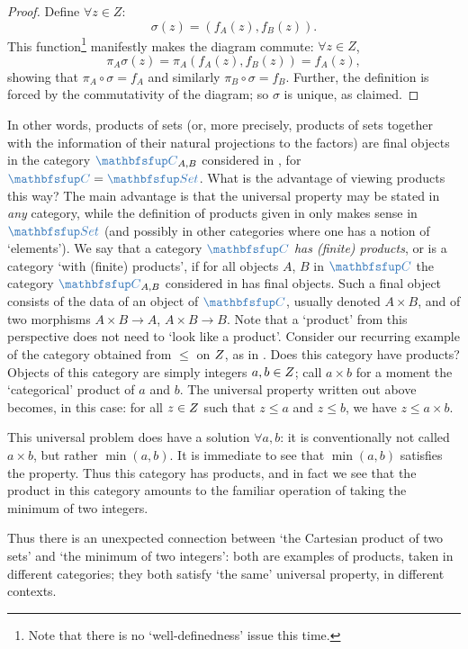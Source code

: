 \begin{proof}
  Define $\forall z \in Z$:
  \[
    \sigma(z) = (f_A(z), f_B(z)).
  \]
  This function\footnote{Note that there is no `well-definedness'
    issue this time.} manifestly makes the diagram commute:
  $\forall z \in Z$,
  \[
    \pi_A \sigma(z) = \pi_A(f_A(z), f_B(z)) = f_A(z),
  \]
  showing that $\pi_A \circ \sigma = f_A$ and similarly
  $\pi_B \circ \sigma = f_B$. Further, the definition is forced by the
  commutativity of the diagram; so $\sigma$ is unique, as claimed.
\end{proof}
In other words, products of sets (or, more precisely, products of sets
together with the information of their natural projections to the
factors) are final objects in the category $\categ{C}_{A,B}$
considered in , for
$\categ{C} = \categ{Set}$.  What is the advantage of viewing products
this way? The main advantage is that the universal property may be
stated in \emph{any} category, while the definition of products given
in  only makes sense
in $\categ{Set}$ (and possibly in other categories where one has a
notion of `elements'). We say that a category $\categ{C}$ \emph{has
  (finite) products}, or is a category `with (finite) products', if
for all objects $A$, $B$ in $\categ{C}$ the category $\categ{C}_{A,B}$
considered in  has final
objects. Such a final object consists of the data of an object of
$\categ{C}$, usually denoted $A \times B$, and of two morphisms
$A \times B \to A$, $A \times B \to B$.  Note that a `product' from
this perspective does not need to `look like a product'. Consider our
recurring example of the category obtained from $\leq$ on $Z$, as in
. Does this category have products?
Objects of this category are simply integers $a, b \in Z$; call
$a \times b$ for a moment the `categorical' product of $a$ and
$b$. The universal property written out above becomes, in this case:
for all $z \in Z$ such that $z \leq a$ and $z \leq b$, we have
$z \leq a \times b$.

This universal problem does have a solution $\forall a, b$: it is
conventionally not called $a \times b$, but rather $\min(a, b)$. It is
immediate to see that $\min(a, b)$ satisfies the property. Thus this
category has products, and in fact we see that the product in this
category amounts to the familiar operation of taking the minimum of
two integers.

Thus there is an unexpected connection between `the Cartesian product
of two sets' and `the minimum of two integers': both are examples of
products, taken in different categories; they both satisfy `the same'
universal property, in different contexts.

